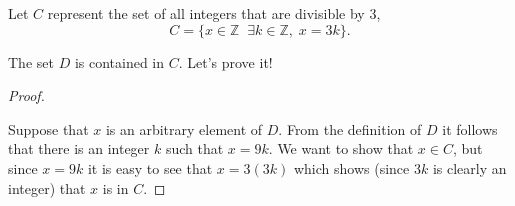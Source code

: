 \documentclass[10pt,]{book}
\theoremstyle{plain}
\theoremstyle{definition}
\theoremstyle{definition}
\numberwithin{equation}{section}
\newcommand{\suchthat}{\;  \;}
\newcommand{\Integers}{{\mathbb Z}}
\begin{document}
    Let \(C\) represent the set of all integers that are divisible by 3,
    \begin{equation*}
      C = \{ x \in \Integers \suchthat \exists k \in \Integers, \; x=3k \}.
    \end{equation*}
\par

    The set \(D\) is contained in \(C\). Let's prove
    it!
\begin{proof}\hypertarget{proof-22}{}

      Suppose that \(x\) is an arbitrary element of \(D\). From the definition
      of \(D\) it follows that there is an integer \(k\) such that \(x=9k\).
      We want to show that \(x \in C\), but since \(x=9k\) it is easy to
      see that \(x = 3(3k)\) which shows (since \(3k\) is clearly an integer)
      that \(x\) is in \(C\).
\end{proof}
\typeout{************************************************}
\typeout{************************************************}
\end{document}
